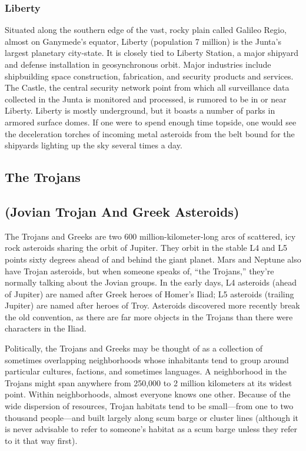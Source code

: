 \subsubsection{Liberty}

Situated along the southern edge of the vast, rocky 
plain called Galileo Regio, almost on Ganymede's 
equator, Liberty (population 7 million) is the Junta's 
largest planetary city-state. It is closely tied to Liberty 
Station, a major shipyard and defense installation in 
geosynchronous orbit. Major industries include shipbuilding
space construction, fabrication, and security
products and services. The Castle, the central security 
network point from which all surveillance data collected
in the Junta is monitored and processed, is
rumored to be in or near Liberty. Liberty is mostly 
underground, but it boasts a number of parks in armored
surface domes. If one were to spend enough
time topside, one would see the deceleration torches 
of incoming metal asteroids from the belt bound for 
the shipyards lighting up the sky several times a day.

\subsection{The Trojans}


\subsection{(Jovian Trojan And Greek Asteroids)}

The Trojans and Greeks are two 600 million-kilometer-long
arcs of scattered, icy rock asteroids sharing
the orbit of Jupiter. They orbit in the stable L4 and 
L5 points sixty degrees ahead of and behind the giant 
planet. Mars and Neptune also have Trojan asteroids, 
but when someone speaks of, ``the Trojans,'' they're 
normally talking about the Jovian groups. In the early 
days, L4 asteroids (ahead of Jupiter) are named after 
Greek heroes of Homer's Iliad; L5 asteroids (trailing 
Jupiter) are named after heroes of Troy. Asteroids 
discovered more recently break the old convention, as 
there are far more objects in the Trojans than there 
were characters in the Iliad.

Politically, the Trojans and Greeks may be thought 
of as a collection of sometimes overlapping neighborhoods
whose inhabitants tend to group around particular
cultures, factions, and sometimes languages.
A neighborhood in the Trojans might span anywhere 
from 250,000 to 2 million kilometers at its widest 
point. Within neighborhoods, almost everyone knows 
one other. Because of the wide dispersion of resources, 
Trojan habitats tend to be small—from one to two 
thousand people—and built largely along scum barge 
or cluster lines (although it is never advisable to refer 
to someone's habitat as a scum barge unless they refer 
to it that way first).

